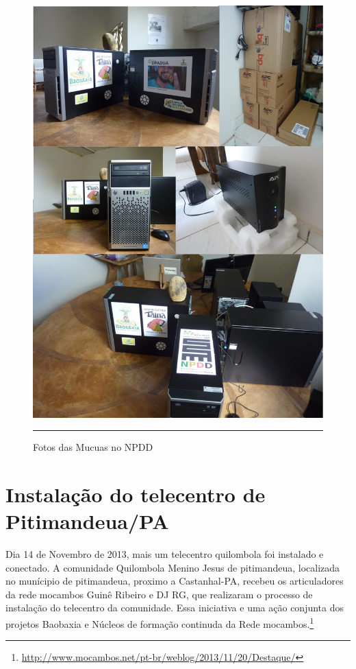 \documentclass[a4paper, 11pt, oneside]{Relatorio_sem}  %
\begin{document}
\begin{figure}[htbp]
  \centering
  \includegraphics[width=\textwidth]{./Fig/Fotos_Mucuas.pdf}
  \rule{35em}{0.5pt}
  \caption[Fotos das Mucuas no NPDD]{Fotos das Mucuas no NPDD}
  \label{fig:Mucuas}
\end{figure}



\section{Instalação do telecentro de Pitimandeua/PA}

Dia 14 de Novembro de 2013, mais um telecentro quilombola foi
instalado e conectado.  A comunidade Quilombola Menino Jesus de
pitimandeua, localizada no munícipio de pitimandeua, proximo a
Castanhal-PA, recebeu os articuladores da rede mocambos Guinê Ribeiro
e DJ RG, que realizaram o processo de instalação do telecentro da
comunidade.  Essa iniciativa e uma ação conjunta dos projetos Baobaxia
e Núcleos de formação continuda da Rede
mocambos.\footnote{\url{http://www.mocambos.net/pt-br/weblog/2013/11/20/Destaque/}}
\end{document}
